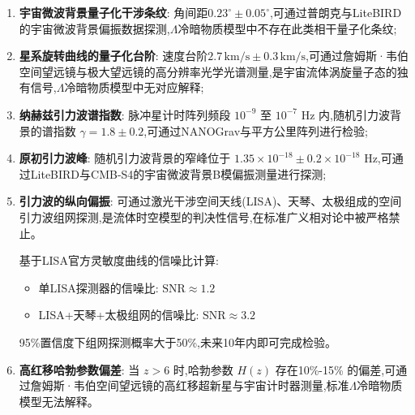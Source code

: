 \documentclass[11pt,a4paper]{article}
\begin{document}
\begin{enumerate}
\item \textbf{宇宙微波背景量子化干涉条纹}: 角间距$0.23^\circ\pm0.05^\circ$,可通过普朗克与LiteBIRD的宇宙微波背景偏振数据探测,$\Lambda$冷暗物质模型中不存在此类相干量子化条纹;

\item \textbf{星系旋转曲线的量子化台阶}: 速度台阶$2.7\,\text{km/s}\pm0.3\,\text{km/s}$,可通过詹姆斯·韦伯空间望远镜与极大望远镜的高分辨率光学光谱测量,是宇宙流体涡旋量子态的独有信号,$\Lambda$冷暗物质模型中无对应解释;

\item \textbf{纳赫兹引力波谱指数}: 脉冲星计时阵列频段 $10^{-9}$ 至 $10^{-7}$ Hz 内,随机引力波背景的谱指数 $\gamma=1.8\pm0.2$,可通过NANOGrav与平方公里阵列进行检验;

\item \textbf{原初引力波峰}: 随机引力波背景的窄峰位于 $1.35\times10^{-18}\pm0.2\times10^{-18}$ Hz,可通过LiteBIRD与CMB-S4的宇宙微波背景B模偏振测量进行探测;

\item \textbf{引力波的纵向偏振}: 可通过激光干涉空间天线(LISA)、天琴、太极组成的空间引力波组网探测,是流体时空模型的判决性信号,在标准广义相对论中被严格禁止。

基于LISA官方灵敏度曲线的信噪比计算:
\begin{itemize}
\item 单LISA探测器的信噪比: $\text{SNR} \approx 1.2$
\item LISA+天琴+太极组网的信噪比: $\text{SNR} \approx 3.2$
\end{itemize}
95\%置信度下组网探测概率大于50\%,未来10年内即可完成检验。

\item \textbf{高红移哈勃参数偏差}: 当 $z>6$ 时,哈勃参数 $H(z)$ 存在10\%-15\% 的偏差,可通过詹姆斯·韦伯空间望远镜的高红移超新星与宇宙计时器测量,标准$\Lambda$冷暗物质模型无法解释。
\end{enumerate}
\end{document}

